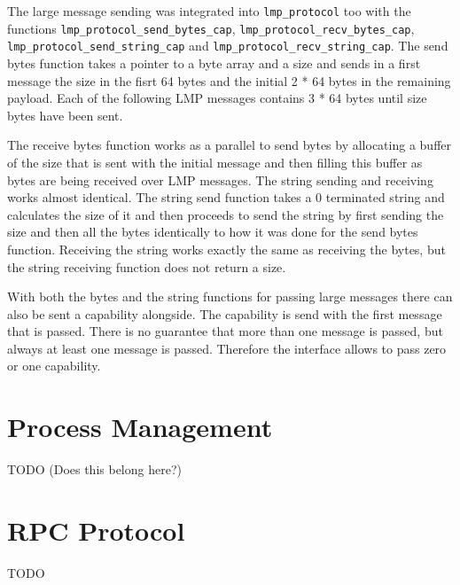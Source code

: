 The large message sending was integrated into \verb|lmp_protocol| too with the functions \verb|lmp_protocol_send_bytes_cap|, \verb|lmp_protocol_recv_bytes_cap|, \verb|lmp_protocol_send_string_cap| and \verb|lmp_protocol_recv_string_cap|. The send bytes function takes a pointer to a byte array and a size and sends in a first message the size in the fisrt 64 bytes and the initial 2 * 64 bytes in the remaining payload. Each of the following LMP messages contains 3 * 64 bytes until size bytes have been sent.

The receive bytes function works as a parallel to send bytes by allocating a buffer of the size that is sent with the initial message and then filling this buffer as bytes are being received over LMP messages.
The string sending and receiving works almost identical. The string send function takes a 0 terminated string and calculates the size of it and then proceeds to send the string by first sending the size and then all the bytes identically to how it was done for the send bytes function. Receiving the string works exactly the same as receiving the bytes, but the string receiving function does not return a size.

With both the bytes and the string functions for passing large messages there can also be sent a capability alongside. The capability is send with the first message that is passed. There is no guarantee that more than one message is passed, but always at least one message is passed. Therefore the interface allows to pass zero or one capability.

\section{Process Management}

TODO
(Does this belong here?)

\section{RPC Protocol}

TODO
